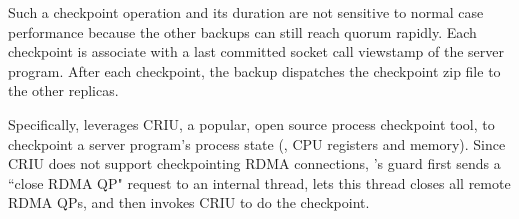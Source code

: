 Such a checkpoint operation and its duration are not sensitive to normal case
performance because the other backups can still reach quorum rapidly. Each 
checkpoint is associate with a last committed socket call viewstamp of the 
server program. After each checkpoint, the backup dispatches the checkpoint zip 
file to the other replicas.

Specifically, \xxx leverages CRIU, a popular, open source process checkpoint 
tool, to checkpoint a server program's process state (\eg, CPU registers and 
memory). Since CRIU does not support checkpointing RDMA connections, \xxx's 
guard first sends a ``close RDMA QP" request to an \xxx internal thread, lets 
this thread closes all remote RDMA QPs, and then invokes CRIU to do the 
checkpoint.





